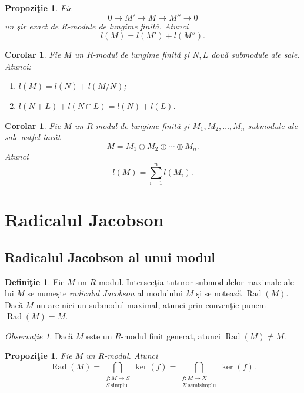 \documentclass[12pt,a4paper]{book}
\DeclareMathOperator{\Rad}{Rad}
\theoremstyle{plain}
\newtheorem{proposition}[theorem]{Propoziţie}
\newtheorem{corollary}[theorem]{Corolar}
\theoremstyle{definition}
\newtheorem{definition}[theorem]{Definiţie}
\theoremstyle{remark}
\newtheorem{remark}[theorem]{Observaţie}
\begin{document}
\begin{proposition}
Fie
\[
  0 \longrightarrow M' \longrightarrow M \longrightarrow M'' \longrightarrow 0
\]
un şir exact de \(R\)-module de lungime finită. Atunci
\[
  l(M) = l(M') + l(M'').
\]
\end{proposition}

\begin{corollary}
Fie \(M\) un \(R\)-modul de lungime finită şi \(N,L\) două submodule ale
sale. Atunci:
\begin{enumerate}
  \item \(l(M) = l(N) + l(M/N)\);
  \item \(l(N+L) + l(N\cap L) = l(N) + l(L)\).
\end{enumerate}
\end{corollary}

\begin{corollary}
Fie \(M\) un \(R\)-modul de lungime finită şi \(M_1,M_2,\ldots,M_n\)
submodule ale sale astfel încât
\[
  M = M_1 \oplus M_2 \oplus \cdots \oplus M_n.
\]
Atunci
\[
  l(M) = \sum_{i=1}^{n} l(M_i).
\]
\end{corollary}

\section{Radicalul Jacobson}
\subsection*{Radicalul Jacobson al unui modul}


\begin{definition}
Fie \(M\) un \(R\)-modul. Intersecţia tuturor submodulelor maximale ale
lui \(M\) se numeşte \emph{radicalul Jacobson} al modulului \(M\) şi se
notează \(\Rad(M)\). Dacă \(M\) nu are nici un submodul maximal, atunci
prin convenţie punem \(\Rad(M)=M\).
\end{definition}

\begin{remark}
Dacă \(M\) este un \(R\)-modul finit generat, atunci \(\Rad(M)\ne M\).
\end{remark}

\begin{proposition}
Fie \(M\) un \(R\)-modul. Atunci
\[
  \Rad(M)
  = \bigcap_{\substack{f : M \to S\\ S\ \text{simplu}}} \ker(f)
  = \bigcap_{\substack{f : M \to X\\ X\ \text{semisimplu}}} \ker(f).
\]
\end{proposition}
\end{document}
